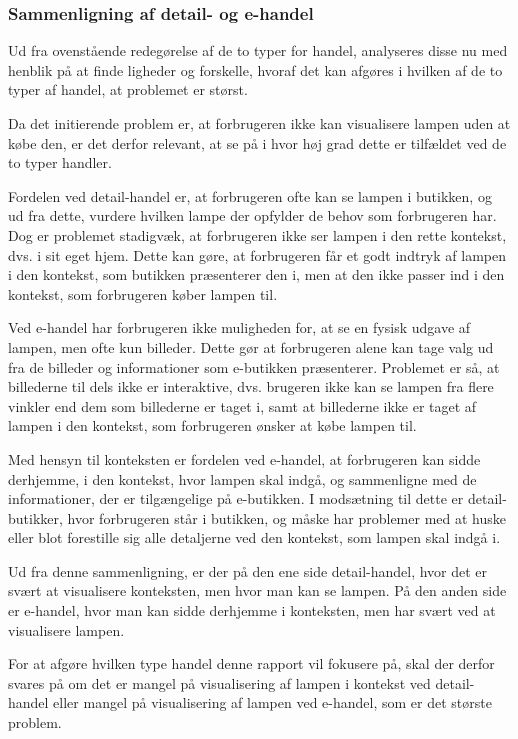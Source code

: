 \subsubsection{Sammenligning af detail- og e-handel}
Ud fra ovenstående redegørelse af de to typer for handel, analyseres disse nu med henblik på at finde ligheder og forskelle, hvoraf det kan afgøres i hvilken af de to typer af handel, at problemet er størst. 

Da det initierende problem er, at forbrugeren ikke kan visualisere lampen uden at købe den, er det derfor relevant, at se på i hvor høj grad dette er tilfældet ved de to typer handler.

Fordelen ved detail-handel er, at forbrugeren ofte kan se lampen i butikken, og ud fra dette, vurdere hvilken lampe der opfylder de behov som forbrugeren har. Dog er problemet stadigvæk, at forbrugeren ikke ser lampen i den rette kontekst, dvs. i sit eget hjem. Dette kan gøre, at forbrugeren får et godt indtryk af lampen i den kontekst, som butikken præsenterer den i, men at den ikke passer ind i den kontekst, som forbrugeren køber lampen til.

Ved e-handel har forbrugeren ikke muligheden for, at se en fysisk udgave af lampen, men ofte kun billeder. Dette gør at forbrugeren alene kan tage valg ud fra de billeder og informationer som e-butikken præsenterer. Problemet er så, at billederne til dels ikke er interaktive, dvs. brugeren ikke kan se lampen fra flere vinkler end dem som billederne er taget i, samt at billederne ikke er taget af lampen i den kontekst, som forbrugeren ønsker at købe lampen til. 

Med hensyn til konteksten er fordelen ved e-handel, at forbrugeren kan sidde derhjemme, i den kontekst, hvor lampen skal indgå, og sammenligne med de informationer, der er tilgængelige på e-butikken. I modsætning til dette er detail-butikker, hvor forbrugeren står i butikken, og måske har problemer med at huske eller blot forestille sig alle detaljerne ved den kontekst, som lampen skal indgå i.

Ud fra denne sammenligning, er der på den ene side detail-handel, hvor det er svært at visualisere konteksten, men hvor man kan se lampen. På den anden side er e-handel, hvor man kan sidde derhjemme i konteksten, men har svært ved at visualisere lampen. 

For at afgøre hvilken type handel denne rapport vil fokusere på, skal der derfor svares på om det er mangel på visualisering af lampen i kontekst ved detail-handel eller mangel på visualisering af lampen ved e-handel, som er det største problem.

